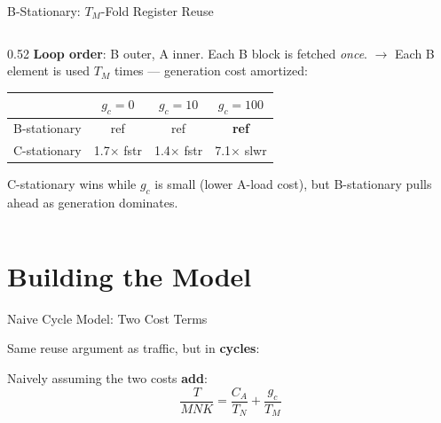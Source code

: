 \documentclass[aspectratio=169]{beamer}
\begin{document}
\begin{frame}{B-Stationary: $T_M$-Fold Register Reuse}
\begin{columns}[c]
    \begin{column}{0.52\textwidth}
      \textbf{Loop order}: B outer, A inner.
      Each B block is fetched \emph{once}.
      $\rightarrow$ Each B element is used $T_M$ times --- generation cost amortized:

      \bigskip
      \renewcommand{\arraystretch}{1.3}
      \begin{tabular}{@{}lccc@{}}
        \toprule
        & $g_c{=}0$ & $g_c{=}10$ & $g_c{=}100$ \\
        \midrule
        B-stationary  & ref             & ref             & \textbf{ref} \\
        C-stationary  & 1.7$\times$ fstr & 1.4$\times$ fstr & 7.1$\times$ slwr \\
        \bottomrule
      \end{tabular}

      \smallskip
      {\footnotesize C-stationary wins while $g_c$ is small (lower A-load
      cost), but B-stationary pulls ahead as generation dominates.}
    \end{column}

  \end{columns}

\end{frame}

\section{Building the Model}
\begin{frame}{Naive Cycle Model: Two Cost Terms}


    \begin{center}
      Same reuse argument as traffic, but in \textbf{cycles}:

      \bigskip
      Naively assuming the two costs \textbf{add}:
      \[
        \frac{T}{MNK} = \frac{C_A}{T_N} + \frac{g_c}{T_M}
      \]
    \end{center}
\end{frame}
\end{document}
